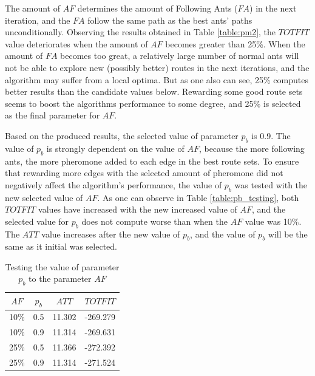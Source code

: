 The amount of $AF$ determines the amount of Following Ants ($FA$) in the next iteration, and the $FA$ follow the same path as the best ants' paths unconditionally. Observing the results obtained in Table \vref{table:pm2}, the $TOTFIT$ value deteriorates when the amount of $AF$ becomes greater than 25\%. When the amount of $FA$ becomes too great, a relatively large number of normal ants will not be able to explore new (possibly better) routes in the next iterations, and the algorithm may suffer from a local optima. But as one also can see, 25\% computes better results than the candidate values below. Rewarding some good route sets seems to boost the algorithms performance to some degree, and 25\% is selected as the final parameter for $AF$.

Based on the produced results, the selected value of parameter $p_b$ is 0.9. The value of $p_b$ is strongly dependent on the value of $AF$, because the more following ants, the more pheromone added to each edge in the best route sets. To ensure that rewarding more edges with the selected amount of pheromone did not negatively affect the algorithm's performance, the value of $p_b$ was tested with the new selected value of $AF$. As one can observe in Table \vref{table:pb_testing}, both $TOTFIT$ values have increased with the new increased value of $AF$, and the selected value for $p_b$ does not compute worse than when the $AF$ value was 10\%. The $ATT$ value increases after the new value of $p_b$, and the value of $p_b$ will be the same as it initial was selected. 

    \begin{table}[H]
    \centering
    \begin{tabular}{|c|c||c|c|}
    \hline
    $AF$ & $p_b$ & $ATT$ & $TOTFIT$\\
    \hline
    10\% & 0.5 & 11.302 & -269.279 \\
    10\% & 0.9 & 11.314 & -269.631 \\
    25\% & 0.5 & 11.366 & -272.392 \\
    25\% & 0.9 & 11.314 & -271.524 \\
    \hline
    \end{tabular}
    \caption {Testing the value of parameter $p_b$ to the parameter $AF$}
    \label{table:pb_testing}
    \end{table}

